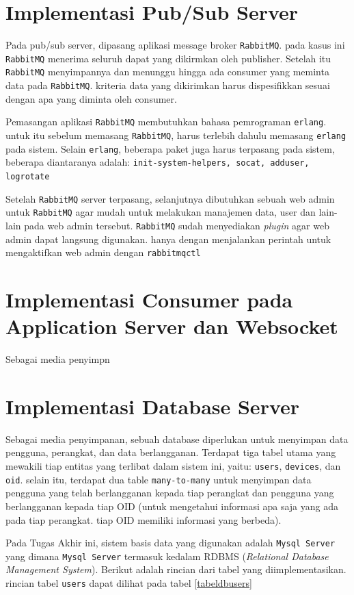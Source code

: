     \section{Implementasi Pub/Sub Server}
    	Pada pub/sub server, dipasang aplikasi message broker \texttt{RabbitMQ}. pada kasus ini \texttt{RabbitMQ} menerima seluruh dapat yang dikirmkan oleh publisher. Setelah itu \texttt{RabbitMQ} menyimpannya dan menunggu hingga ada consumer yang meminta data pada \texttt{RabbitMQ}. kriteria data yang dikirimkan harus dispesifikkan sesuai dengan apa yang diminta oleh consumer.
    	
    	Pemasangan aplikasi \texttt{RabbitMQ} membutuhkan bahasa pemrograman \texttt{erlang}. untuk itu sebelum memasang \texttt{RabbitMQ}, harus terlebih dahulu memasang \texttt{erlang} pada sistem. Selain \texttt{erlang}, beberapa paket juga harus terpasang pada sistem, beberapa diantaranya adalah: \texttt{init-system-helpers, socat, adduser, logrotate}
    	
    	Setelah \texttt{RabbitMQ} server terpasang, selanjutnya dibutuhkan sebuah web admin untuk \texttt{RabbitMQ} agar mudah untuk melakukan manajemen data, user dan lain-lain pada web admin tersebut. \texttt{RabbitMQ} sudah menyediakan \textit{plugin} agar web admin dapat langsung digunakan. hanya dengan menjalankan perintah untuk mengaktifkan web admin dengan \texttt{rabbitmqctl}
    
    \section{Implementasi Consumer pada Application Server dan Websocket}
		Sebagai media penyimpn
    \section{Implementasi Database Server}
    	Sebagai media penyimpanan, sebuah database diperlukan untuk menyimpan data pengguna, perangkat, dan data berlangganan. Terdapat tiga tabel utama yang mewakili tiap entitas yang terlibat dalam sistem ini, yaitu: \texttt{users}, \texttt{devices}, dan \texttt{oid}. selain itu, terdapat dua table \texttt{many-to-many} untuk menyimpan data pengguna yang telah berlangganan kepada tiap perangkat dan pengguna yang berlangganan kepada tiap OID (untuk mengetahui informasi apa saja yang ada pada tiap perangkat. tiap OID memiliki informasi yang berbeda).
    	
    	Pada Tugas Akhir ini, sistem basis data yang digunakan adalah \texttt{Mysql Server} yang dimana \texttt{Mysql Server} termasuk kedalam RDBMS (\textit{Relational Database Management System}). Berikut adalah rincian dari tabel yang diimplementasikan. rincian tabel \texttt{users} dapat dilihat pada tabel \ref{tabeldbusers}
    	
